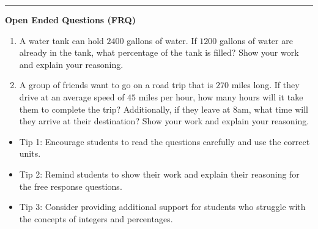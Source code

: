 \documentclass[10pt]{article}
\begin{document}
\vspace{-0.2cm}
\hrule
\vspace{0.2cm}
\textbf{\small Open Ended Questions (FRQ)}
\begin{enumerate}[label=\textbf{Q\arabic*.}, start=9, itemsep=5pt, topsep=0pt]

  \item \small A water tank can hold $2400$ gallons of water. If $1200$ gallons of water are already in the tank, what percentage of the tank is filled? Show your work and explain your reasoning. \vspace{2cm}

  \item \small A group of friends want to go on a road trip that is $270$ miles long. If they drive at an average speed of $45$ miles per hour, how many hours will it take them to complete the trip? Additionally, if they leave at $8$am, what time will they arrive at their destination? Show your work and explain your reasoning. \vspace{2cm}

\end{enumerate}

\vfill

\begin{tcolorbox}[colback=blue!5, colframe=mainblue!50, title=\small \textbf{Chef's Tips}, fonttitle=\bfseries, bottom=1mm]
\begin{itemize}[noitemsep, topsep=2pt, leftmargin=0.5cm]
  \item \scriptsize Tip 1: Encourage students to read the questions carefully and use the correct units.\item \scriptsize Tip 2: Remind students to show their work and explain their reasoning for the free response questions.\item \scriptsize Tip 3: Consider providing additional support for students who struggle with the concepts of integers and percentages.
\end{itemize}
\end{tcolorbox}
\end{document}
